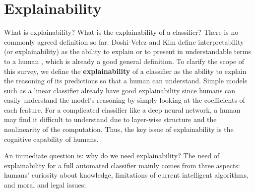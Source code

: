 






\section{Explainability}

What is explainability? What is the explainability of a classifier? There is no commonly agreed definition so far. Doshi-Velez and Kim define interpretability (or explainability) as the ability to explain or to present in understandable terms to a human \cite{doshi-velez2017interpretableml}, which is already a good general definition. To clarify the scope of this survey, we define the \textbf{explainability} of a classifier as the ability to explain the reasoning of its predictions so that a human can understand. Simple models such as a linear classifier already have good explainability since humans can easily understand the model's reasoning by simply looking at the coefficients of each feature. For a complicated classifier like a deep neural network, a human may find it difficult to understand due to layer-wise structure and the nonlinearity of the computation. Thus, the key issue of explainability is the cognitive capability of humans.

An immediate question is: why do we need explainability? 
The need of explainability for a full automated classifier mainly comes from three aspects: humans' curiosity about knowledge, limitations of current intelligent algorithms, and moral and legal issues:

